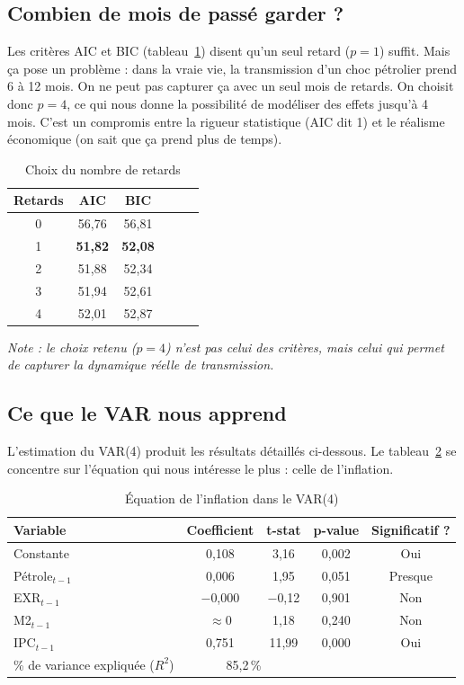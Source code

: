 \documentclass[12pt,a4paper]{article}
\begin{document}
\subsection{Combien de mois de passé garder ?}

Les critères AIC et BIC (tableau~\ref{tab:lags}) disent qu'un seul retard ($p=1$) suffit. Mais ça pose un problème : dans la vraie vie, la transmission d'un choc pétrolier prend 6 à 12 mois. On ne peut pas capturer ça avec un seul mois de retards. On choisit donc $p=4$, ce qui nous donne la possibilité de modéliser des effets jusqu'à 4 mois. C'est un compromis entre la rigueur statistique (AIC dit 1) et le réalisme économique (on sait que ça prend plus de temps).

\begin{table}[H]
  \centering
  \caption{Choix du nombre de retards}
  \label{tab:lags}
  \begin{tabular}{cccccc}
    \toprule
    Retards & AIC & BIC \\
    \midrule
    0 & 56,76 & 56,81 \\
    1 & \textbf{51,82} & \textbf{52,08} \\
    2 & 51,88 & 52,34 \\
    3 & 51,94 & 52,61 \\
    4 & 52,01 & 52,87 \\
    \bottomrule
  \end{tabular}
  \small\textit{Note : le choix retenu ($p=4$) n'est pas celui des critères, mais celui qui permet de capturer la dynamique réelle de transmission.}
\end{table}

\subsection{Ce que le VAR nous apprend}

L'estimation du VAR(4) produit les résultats détaillés ci-dessous. Le tableau~\ref{tab:var_inf} se concentre sur l'équation qui nous intéresse le plus : celle de l'inflation.

\begin{table}[H]
  \centering
  \caption{Équation de l'inflation dans le VAR(4)}
  \label{tab:var_inf}
  \begin{tabular}{lcccc}
    \toprule
    Variable & Coefficient & t-stat & p-value & Significatif ? \\
    \midrule
    Constante & 0,108 & 3,16 & 0,002 & Oui \\
    Pétrole$_{t-1}$ & 0,006 & 1,95 & 0,051 & Presque \\
    EXR$_{t-1}$ & $-$0,000 & $-$0,12 & 0,901 & Non \\
    M2$_{t-1}$ & $\approx$0 & 1,18 & 0,240 & Non \\
    IPC$_{t-1}$ & 0,751 & 11,99 & 0,000 & Oui \\
    \% de variance expliquée ($R^2$) & \multicolumn{2}{c}{85,2\,\%} & & \\
    \bottomrule
  \end{tabular}
\end{table}
\end{document}
